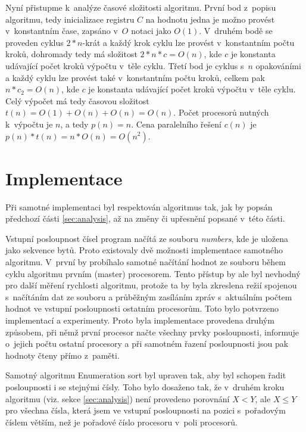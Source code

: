 \documentclass[a4paper, 12pt]{article}
\begin{document}
Nyní přistupme k~analýze časové složitosti algoritmu.
První bod z~popisu algoritmu, tedy inicializace registru $C$ na hodnotu jedna je možno provést v~konstantním čase,
zapsáno v~$O$ notaci jako $O(1)$.
V~druhém bodě se proveden cyklus $2*n$-krát a každý krok cyklu lze provést v~konstantním počtu kroků, dohromady tedy
má složitost $2*n*c=O(n)$, kde $c$ je konstanta udávající počet kroků výpočtu v~těle cyklu.
Třetí bod je cyklus s~$n$ opakováními a každý cyklu lze provést také v~konstantním počtu kroků, celkem pak $n*c_2=O(n)$,
kde $c$ je konstanta udávající počet kroků výpočtu v~těle cyklu.
Celý výpočet má tedy časovou složitost $t(n)=O(1)+O(n)+O(n)=O(n)$.
Počet procesorů nutných k~výpočtu je $n$, a tedy $p(n)=n$.
Cena paralelního řešení $c(n)$ je $p(n)*t(n)=n*O(n)=O(n^2)$.


\section{Implementace}
\label{sec:impl}
Při samotné implementaci byl respektován algoritmus tak, jak by popsán předchozí části \ref{sec:analysis}, až na změny či upřesnění popsané v~této části.

Vstupní posloupnost čísel program načítá ze souboru \emph{numbers}, kde je uložena jako sekvence bytů.
Proto existovaly dvě možnosti implementace samotného algoritmu.
V~první by probíhalo samotné načítání hodnot ze souboru během cyklu algoritmu prvním (master) procesorem.
Tento přístup by ale byl nevhodný pro další měření rychlosti algoritmu, protože ta by byla
zkreslena režií spojenou s~načítáním dat ze souboru a průběžným zasíláním zpráv s~aktuálním počtem hodnot
ve vstupní posloupnosti ostatním procesorům.
Toto bylo potvrzeno implementací a experimenty.
Proto byla implementace provedena druhým způsobem, při němž první procesor načte všechny prvky posloupnosti,
informuje o~jejich počtu ostatní procesory a při samotném řazení posloupnosti jsou pak hodnoty čteny přímo z~paměti.

Samotný algoritmu Enumeration sort byl upraven tak, aby byl schopen řadit posloupnosti i se stejnými čísly.
Toho bylo dosaženo tak, že v~druhém kroku algoritmu (viz. sekce \ref{sec:analysis}) není provedeno
porovnání $X<Y$, ale $X \leq Y$ pro všechna čísla, která jsem ve vstupní posloupnosti na pozici s~pořadovým
číslem větším, než je pořadové číslo procesoru v~poli procesorů.
\end{document}
